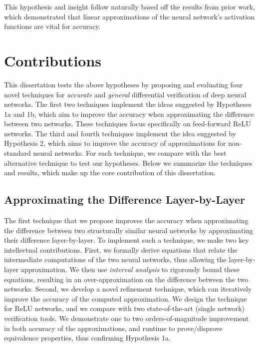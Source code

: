 This hypothesis and insight follow naturally based off the results from prior
work, which demonstrated that linear approximations of the neural network's
activation functions are vital for accuracy.

\section{Contributions}
This dissertation tests the above hypotheses by proposing and evaluating four
novel techniques
for \textit{accurate} and \textit{general} differential verification of deep
neural networks. The first two techniques implement the ideas suggested by
Hypotheses 1a and 1b, which aim to improve the accuracy when approximating the
difference between two networks. These techniques focus specifically on
feed-forward ReLU networks. The third and fourth techniques implement the idea
suggested by Hypothesis 2, which aims to improve the accuracy of approximations
for non-standard neural networks. For each technique, we compare with the best
alternative technique to test our hypotheses. Below we summarize the techniques
and results, which make up the core contribution of this dissertation.

\subsection{Approximating the Difference Layer-by-Layer}
The first technique that we propose improves the accuracy when approximating the
difference between two structurally similar neural networks by approximating
their difference layer-by-layer. To implement such a technique, we make two key
intellectual contributions. First, we formally derive equations that relate the
intermediate computations of the two neural networks, thus allowing the
layer-by-layer approximation. We then use \textit{interval analysis} to
rigorously bound these
equations, resulting in an over-approximation on the difference between the two
networks. Second, we develop a novel refinement technique, which can
iteratively improve the accuracy of the computed approximation. We
design the technique for ReLU networks, and we compare with two state-of-the-art
(single network) verification tools. We demonstrate one to two
orders-of-magnitude improvement in both accuracy of the approximations, and
runtime to prove/disprove equivalence properties, thus confirming Hypothesis 1a.

